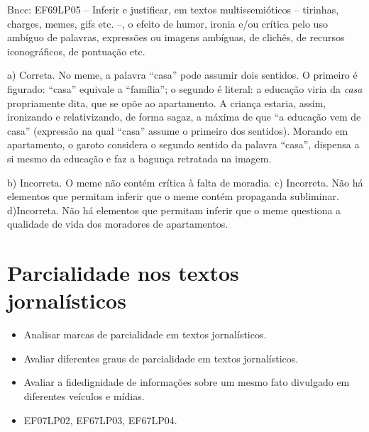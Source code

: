 {{Bncc: EF69LP05 -- Inferir e justificar, em textos multissemióticos --
tirinhas, charges, memes, gifs etc. --, o efeito de humor, ironia e/ou
crítica pelo uso ambíguo de palavras, expressões ou imagens ambíguas, de
clichês, de recursos iconográficos, de pontuação etc.

a) Correta. No meme, a palavra ``casa'' pode assumir dois sentidos. O primeiro
é figurado: ``casa'' equivale a ``família''; o segundo é literal: a educação
viria da \textit{casa} propriamente dita, que se opõe ao apartamento. A criança 
estaria, assim, ironizando e relativizando, de forma sagaz, a máxima de que 
``a educação vem de casa'' (expressão na qual ``casa'' assume o primeiro dos 
sentidos). Morando em apartamento, o garoto considera o segundo sentido da palavra
``casa'', dispensa a si mesmo da educação e faz a bagunça retratada na imagem.    

b) Incorreta. O meme não contém crítica à falta de moradia.
c) Incorreta. Não há elementos que permitam inferir que o meme contém propaganda 
subliminar. 
d)Incorreta. Não há elementos que permitam inferir que o meme questiona a qualidade 
de vida dos moradores de apartamentos.}

\chapter{Parcialidade nos textos jornalísticos}


\begin{itemize}

  \item Analisar marcas de parcialidade em textos jornalísticos.

  \item Avaliar diferentes graus de parcialidade em textos jornalísticos.

  \item Avaliar a fidedignidade de informações sobre um mesmo fato divulgado 
  em diferentes veículos e mídias.

\end{itemize}


\begin{itemize}

  \item EF07LP02, EF67LP03, EF67LP04.

\end{itemize}

}
